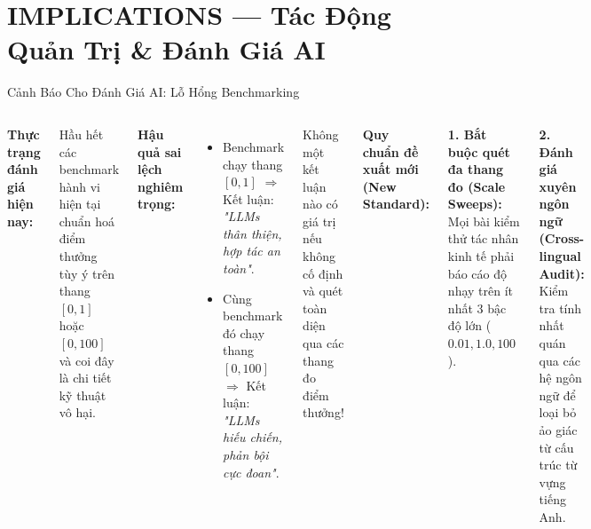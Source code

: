 \documentclass[aspectratio=169,9pt]{beamer}
\begin{document}
\section{IMPLICATIONS — Tác Động Quản Trị \& Đánh Giá AI}

\begin{frame}{Cảnh Báo Cho Đánh Giá AI: Lỗ Hổng Benchmarking}

\begin{columns}[T]

\textbf{Thực trạng đánh giá hiện nay:}
\begin{badbox}
\footnotesize Hầu hết các benchmark hành vi hiện tại chuẩn hoá điểm thưởng tùy ý trên thang $[0, 1]$ hoặc $[0, 100]$ và coi đây là chi tiết kỹ thuật vô hại.
\end{badbox}

\vspace{0.4em}
\textbf{Hậu quả sai lệch nghiêm trọng:}
\begin{itemize}\setlength\itemsep{4pt}
  \item Benchmark chạy thang $[0, 1]$ $\Rightarrow$ Kết luận: \textit{"LLMs thân thiện, hợp tác an toàn"}.
  \item Cùng benchmark đó chạy thang $[0, 100]$ $\Rightarrow$ Kết luận: \textit{"LLMs hiếu chiến, phản bội cực đoan"}.
\end{itemize}

\vspace{0.4em}
\begin{primarybox}
\footnotesize Không một kết luận nào có giá trị nếu không cố định và quét toàn diện qua các thang đo điểm thưởng!
\end{primarybox}


\textbf{Quy chuẩn đề xuất mới (New Standard):}

\vspace{0.3em}
\begin{goodbox}
\footnotesize
\textbf{1. Bắt buộc quét đa thang đo (Scale Sweeps):}\\
Mọi bài kiểm thử tác nhân kinh tế phải báo cáo độ nhạy trên ít nhất 3 bậc độ lớn ($0.01, 1.0, 100$).
\end{goodbox}

\vspace{0.4em}
\begin{goodbox}
\footnotesize
\textbf{2. Đánh giá xuyên ngôn ngữ (Cross-lingual Audit):}\\
Kiểm tra tính nhất quán qua các hệ ngôn ngữ để loại bỏ ảo giác từ cấu trúc từ vựng tiếng Anh.
\end{goodbox}


\end{columns}
\end{frame}
\end{document}
